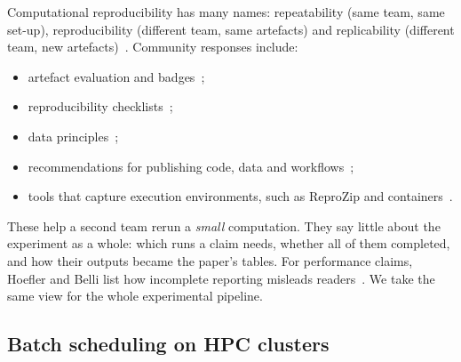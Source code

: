 \documentclass[pdflatex,sn-mathphys-num]{sn-jnl}
\theoremstyle{thmstyleone}%
\theoremstyle{thmstyletwo}%
\theoremstyle{thmstylethree}%
\begin{document}
Computational reproducibility has many names: repeatability (same team, same
set-up), reproducibility (different team, same artefacts) and replicability
(different team, new
artefacts)~\cite{acm2020badges,vitek2011repeatability}. Community responses
include:
\begin{itemize}[leftmargin=1.4em, itemsep=1pt]
\item artefact evaluation and badges~\cite{acm2020badges};
\item reproducibility checklists~\cite{pineau2021improving};
\item data principles~\cite{wilkinson2016fair};
\item recommendations for publishing code, data and
workflows~\cite{stodden2016enhancing};
\item tools that capture execution environments, such as ReproZip and
containers~\cite{chirigati2016reprozip,kurtzer2017singularity}.
\end{itemize}
These help a second team rerun a \emph{small} computation. They say little
about the experiment as a whole: which runs a claim needs, whether all of them
completed, and how their outputs became the paper's tables. For performance
claims, Hoefler and Belli list how incomplete reporting misleads
readers~\cite{hoefler2015scientific}. We take the same view for the whole
experimental pipeline.

\subsection{Batch scheduling on HPC clusters}\label{sec:bg-slurm}
\end{document}
